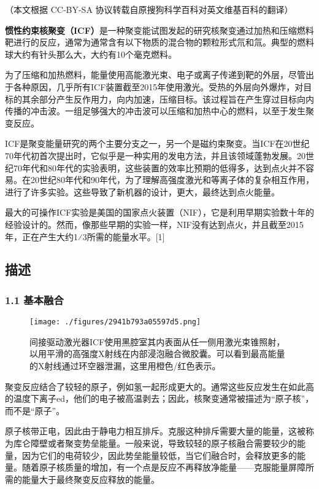 
（本文根据 CC-BY-SA 协议转载自原搜狗科学百科对英文维基百科的翻译）

\textbf{惯性约束核聚变（ICF）}是一种聚变能试图发起的研究核聚变通过加热和压缩燃料靶进行的反应，通常为通常含有以下物质的混合物的颗粒形式氘和氚。典型的燃料球大约有针头那么大，大约有10个毫克燃料。

为了压缩和加热燃料，能量使用高能激光束、电子或离子传递到靶的外层，尽管出于各种原因，几乎所有ICF装置截至2015年使用激光。受热的外层向外爆炸，对目标的其余部分产生反作用力，向内加速，压缩目标。该过程旨在产生穿过目标向内传播的冲击波。一组足够强大的冲击波可以压缩和加热中心的燃料，以至于发生聚变反应。

ICF是聚变能量研究的两个主要分支之一，另一个是磁约束聚变。当ICF在20世纪70年代初首次提出时，它似乎是一种实用的发电方法，并且该领域蓬勃发展。20世纪70年代和80年代的实验表明，这些装置的效率比预期的低得多，达到点火并不容易。在20世纪80年代和90年代，为了理解高强度激光和等离子体的复杂相互作用，进行了许多实验。这些导致了新机器的设计，更大，最终达到点火能量。

最大的可操作ICF实验是美国的国家点火装置（NIF），它是利用早期实验数十年的经验设计的。然而，像那些早期的实验一样，NIF没有达到点火，并且截至2015年，正在产生大约1⁄3所需的能量水平。[1]

\subsection{描述}
\subsubsection{1.1 基本融合}
\begin{figure}[ht]
\centering
\texttt{[image: ./figures/2941b793a05597d5.png]}
\caption{间接驱动激光器ICF使用黑腔室其内表面从任一侧用激光束锥照射，以用平滑的高强度X射线在内部浸泡融合微胶囊。可以看到最高能量的X射线通过环空器泄漏，这里用橙色/红色表示。} \label{fig_GXYS_1}
\end{figure}
聚变反应结合了较轻的原子，例如氢一起形成更大的。通常这些反应发生在如此高的温度下离子ed，他们的电子被高温剥去；因此，核聚变通常被描述为“原子核”，而不是“原子”。

原子核带正电，因此由于静电力相互排斥。克服这种排斥需要大量的能量，这被称为库仑障壁或者聚变势垒能量。一般来说，导致较轻的原子核融合需要较少的能量，因为它们的电荷较少，因此势垒能量较低，当它们融合时，会释放更多的能量。随着原子核质量的增加，有一个点是反应不再释放净能量——克服能量屏障所需的能量大于最终聚变反应释放的能量。

